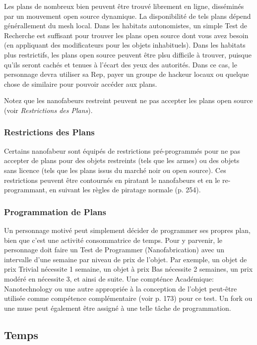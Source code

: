 Les plans de nombreux bien peuvent être trouvé librement en ligne, disséminés par un mouvement open source dynamique. La disponibilité de tels plans dépend générallement du mesh local. Dans les habitats autonomistes, un simple Test de Recherche est suffisant pour trouver les plans open source dont vous avez besoin (en appliquant des modificateurs pour les objets inhabituels). Dans les habitats plus restrictifs, les plans open source peuvent être plsu difficile à trouver, puisque qu'ils seront cachés et tenues à l'écart des yeux des autorités. Dans ce cas, le personnage devra utiliser sa Rep, payer un groupe de hackeur locaux ou quelque chose de similaire pour pouvoir accéder aux plans. 

Notez que les nanofabeurs restreint peuvent ne pas accepter les plans open source (voir \textit{Restrictions des Plans}). 

\subsubsection{Restrictions des Plans} 

Certains nanofabeur sont équipés de restrictions pré-programmés pour ne pas accepter de plans pour des objets restreints (tels que les armes) ou des objets sans licence (tels que les plans issus du marché noir ou open source). Ces restrictions peuvent être contournés en piratant le nanofabeurs et en le re-programmant, en suivant les règles de piratage normale (p. 254). 

\subsubsection{Programmation de Plans} 

Un personnage motivé peut simplement décider de programmer ses propres plan, bien que c'est une activité consommatrice de temps. Pour y parvenir, le personnage doit faire un Test de Programmer (Nanofabrication) avec un intervalle d'une semaine par niveau de prix de l'objet. Par exemple, un objet de prix Trivial nécessite 1 semaine, un objet à prix Bas nécessite 2 semaines, un prix modéré en nécessite 3, et ainsi de suite. Une compténce Académique: Nanotechnology ou une autre appropriée à la conception de l'objet peut-être utilisée comme compétence complémentaire (voir p. 173) pour ce test. Un fork ou une muse peut également être assigné à une telle tâche de programmation. 



\subsection{Temps} 

